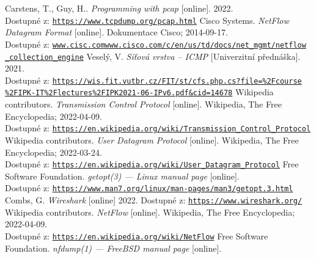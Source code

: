 \documentclass[12pt]{article}
\begin{document}
\pagebreak
\begin{thebibliography}{plain}
   Carstens, T., Guy, H..
	  \emph{Programming with pcap} [online]. 2022. \\
		Dostupné z: \href{https://www.tcpdump.org/pcap.html}{\texttt{https://www.tcpdump.org/pcap.html}}
	 Cisco Systems.
	  \emph{NetFlow Datagram Format} [online]. Dokumentace Cisco; 2014-09-17.\\ 
		Dostupné z: \href{https://en.wikipedia.org/wiki/OSI\_model}{\texttt{www.cisc.comwww.cisco.com/c/en/us/td/docs/net\_mgmt/netflow\\\_collection\_engine}}
	 Veselý, V. 
		\emph{Síťová vrstva -- ICMP} [Univerzitní přednáška]. 2021. \\ 
		Dostupné z: \href{https://wis.fit.vutbr.cz/FIT/st/cfs.php.cs?file=\%2Fcourse\%2FIPK-IT\%2Flectures\%2FIPK2021-06-IPv6.pdf&cid=14678}{\texttt{https://wis.fit.vutbr.cz/FIT/st/cfs.php.cs?file=\%2Fcourse\\\%2FIPK-IT\%2Flectures\%2FIPK2021-06-IPv6.pdf\&cid=14678}}
	 Wikipedia contributors.
	  \emph{Transmission Control Protocol} [online]. Wikipedia, The Free Encyclopedia; 2022-04-09.\\ 
		Dostupné z: \href{https://en.wikipedia.org/wiki/Transmission\_Control\_Protocol}{\texttt{https://en.wikipedia.org/wiki/Transmission\_Control\_Protocol}}
	 Wikipedia contributors.
	  \emph{User Datagram Protocol} [online]. Wikipedia, The Free Encyclopedia; 2022-03-24. \\
		Dostupné z: \href{https://en.wikipedia.org/wiki/User\_Datagram\_Protocol}{\texttt{https://en.wikipedia.org/wiki/User\_Datagram\_Protocol}}
	 Free Software Foundation. 
		\emph{getopt(3) — Linux manual page} [online].\\
		Dostupné z: \href{https://www.man7.org/linux/man-pages/man3/getopt.3\\.html}{\texttt{https://www.man7.org/linux/man-pages/man3/getopt.3.html}}
	 Combs, G. 
		\emph{Wireshark} [online] 2022.
		Dostupné z: \href{https://www.wireshark.org/}{\texttt{https://www.wireshark.org/}}
	 Wikipedia contributors.
	  \emph{NetFlow} [online]. Wikipedia, The Free Encyclopedia; 2022-04-09.\\ 
		Dostupné z: \href{https://en.wikipedia.org/wiki/NetFlow}{\texttt{https://en.wikipedia.org/wiki/NetFlow}}
	 Free Software Foundation. 
		\emph{nfdump(1) — FreeBSD manual page} [online].\\

\end{thebibliography}
\end{document}
